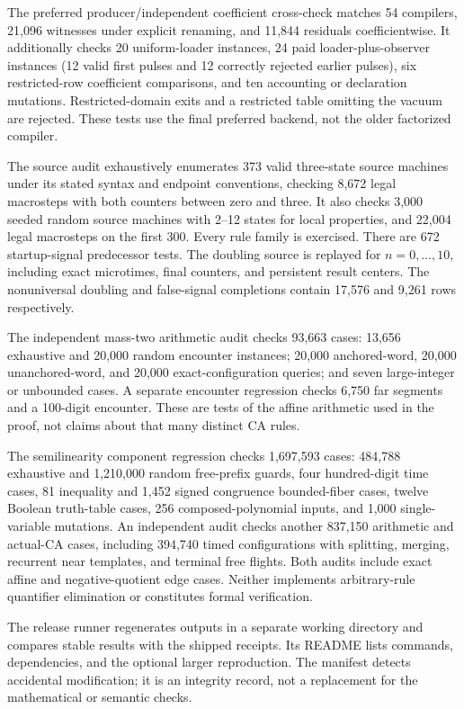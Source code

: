 \documentclass[11pt,letterpaper]{article}
\numberwithin{equation}{section}
\theoremstyle{definition}
\theoremstyle{remark}
\begin{document}
The preferred producer/independent coefficient cross-check matches 54 compilers, 21,096 witnesses under explicit renaming, and 11,844 residuals coefficientwise. It additionally checks 20 uniform-loader instances, 24 paid loader-plus-observer instances (12 valid first pulses and 12 correctly rejected earlier pulses), six restricted-row coefficient comparisons, and ten accounting or declaration mutations. Restricted-domain exits and a restricted table omitting the vacuum are rejected. These tests use the final preferred backend, not the older factorized compiler.

The source audit exhaustively enumerates 373 valid three-state source machines under its stated syntax and endpoint conventions, checking 8,672 legal macrosteps with both counters between zero and three. It also checks 3,000 seeded random source machines with 2--12 states for local properties, and 22,004 legal macrosteps on the first 300. Every rule family is exercised. There are 672 startup-signal predecessor tests. The doubling source is replayed for $n=0,\ldots,10$, including exact microtimes, final counters, and persistent result centers. The nonuniversal doubling and false-signal completions contain 17,576 and 9,261 rows respectively.

The independent mass-two arithmetic audit checks 93,663 cases: 13,656 exhaustive and 20,000 random encounter instances; 20,000 anchored-word, 20,000 unanchored-word, and 20,000 exact-configuration queries; and seven large-integer or unbounded cases. A separate encounter regression checks 6,750 far segments and a 100-digit encounter. These are tests of the affine arithmetic used in the proof, not claims about that many distinct CA rules.

The semilinearity component regression checks 1,697,593 cases: 484,788 exhaustive and 1,210,000 random free-prefix guards, four hundred-digit time cases, 81 inequality and 1,452 signed congruence bounded-fiber cases, twelve Boolean truth-table cases, 256 composed-polynomial inputs, and 1,000 single-variable mutations. An independent audit checks another 837,150 arithmetic and actual-CA cases, including 394,740 timed configurations with splitting, merging, recurrent near templates, and terminal free flights. Both audits include exact affine and negative-quotient edge cases. Neither implements arbitrary-rule quantifier elimination or constitutes formal verification.

The release runner regenerates outputs in a separate working directory and compares stable results with the shipped receipts. Its README lists commands, dependencies, and the optional larger reproduction. The manifest detects accidental modification; it is an integrity record, not a replacement for the mathematical or semantic checks.
\end{document}

